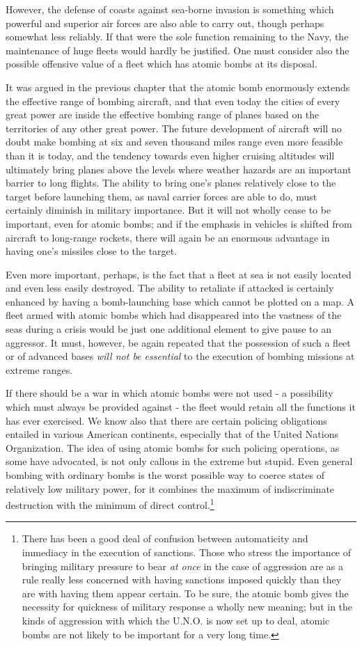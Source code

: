 However, the defense of coasts against sea-borne invasion is something which powerful and superior air forces are also able to carry out, though perhaps somewhat less reliably. If that were the sole function remaining to the Navy, the maintenance of huge fleets would hardly be justified. One must consider also the possible offensive value of a fleet which has atomic bombs at its disposal.

It was argued in the previous chapter that the atomic bomb enormously extends the effective range of bombing aircraft, and that even today the cities of every great power are inside the effective bombing range of planes based on the territories of any other great power. The future development of aircraft will no doubt make bombing at six and seven thousand miles range even more feasible than it is today, and the tendency towards even higher cruising altitudes will ultimately bring planes above the levels where weather hazards are an important barrier to long flights. The ability to bring one's planes relatively close to the target before launching them, as naval carrier forces are able to do, must certainly diminish in military importance. But it will not wholly cease to be important, even for atomic bombs; and if the emphasis in vehicles is shifted from aircraft to long-range rockets, there will again be an enormous advantage in having one's missiles close to the target.

Even more important, perhaps, is the fact that a fleet at sea is not easily located and even less easily destroyed. The ability to retaliate if attacked is certainly enhanced by having a bomb-launching base which cannot be plotted on a map. A fleet armed with atomic bombs which had disappeared into the vastness of the seas during a crisis would be just one additional element to give pause to an aggressor. It must, however, be again repeated that the possession of such a fleet or of advanced bases \emph{will not be essential} to the execution of bombing missions at extreme ranges.

If there should be a war in which atomic bombs were not used - a possibility which must always be provided against - the fleet would retain all the functions it has ever exercised. We know also that there are certain policing obligations entailed in various American continents, especially that of the United Nations Organization. The idea of using atomic bombs for such policing operations, as some have advocated, is not only callous in the extreme but stupid. Even general bombing with ordinary bombs is the worst possible way to coerce states of relatively low military power, for it combines the maximum of indiscriminate destruction with the minimum of direct control.\footnote{There has been a good deal of confusion between automaticity and immediacy in the execution of sanctions. Those who stress the importance of bringing military pressure to bear \emph{at once} in the case of aggression are as a rule really less concerned with having sanctions imposed quickly than they are with having them appear certain. To be sure, the atomic bomb gives the necessity for quickness of military response a wholly new meaning; but in the kinds of aggression with which the U.N.O. is now set up to deal, atomic bombs are not likely to be important for a very long time.}

